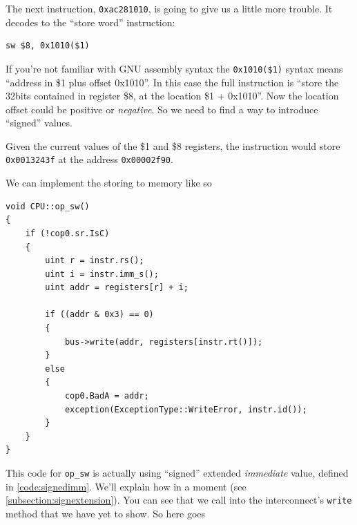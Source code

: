 \documentclass[a4paper]{article}
\newcommand{\code}[1] {\texttt{#1}}
\begin{document}
The next instruction, \code{0xac281010}, is going to give us a
little more trouble. It decodes to the ``store word'' instruction:

\begin{lstlisting}[language=assembly]
sw $8, 0x1010($1)
\end{lstlisting}

If you're not familiar with GNU assembly syntax the
\code{0x1010(\$1)} syntax means ``address in \$1 plus offset
0x1010''. In this case the full instruction is ``store the 32bits contained
in register \$8, at the location \$1 + 0x1010''. Now the location offset could be positive
or \emph{negative}.  So we need to find a way to introduce ``signed'' values.

Given the current values of the \$1 and \$8 registers, the instruction would store
\code{0x0013243f} at the address \code{0x00002f90}.

We can implement the storing to memory like so

\begin{lstlisting}
void CPU::op_sw()
{
	if (!cop0.sr.IsC)
	{
		uint r = instr.rs();
		uint i = instr.imm_s();
		uint addr = registers[r] + i;

		if ((addr & 0x3) == 0)
		{
			bus->write(addr, registers[instr.rt()]);
		}
		else
		{
			cop0.BadA = addr;
			exception(ExceptionType::WriteError, instr.id());
		}
	}
}
\end{lstlisting}

This code for \code{op\_sw} is actually using ``signed'' extended \emph{immediate} value,
defined in \ref{code:signedimm}.
We'll explain how in a moment (see \ref{subsection:signextension}).  You can see that we
call into the interconnect's \code{write} method that we have yet to show. So here goes
\end{document}
